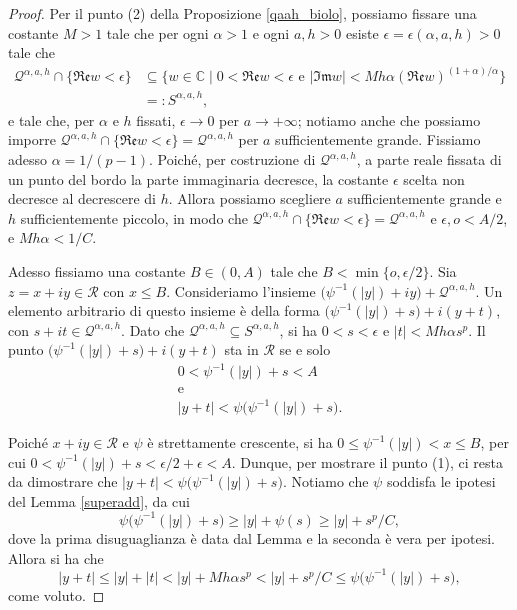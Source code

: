 \begin{proof}
    Per il punto (2) della Proposizione \ref{qaah_biolo}, possiamo fissare una costante $M>1$ tale che per ogni $\alpha>1$ e ogni $a,h>0$ esiste $\epsilon=\epsilon(\alpha,a,h)>0$ tale che
    \begin{align*}
        \mathcal{Q}^{\alpha,a,h}\cap\{\mathfrak{Re}w<\epsilon\}&\subseteq \{w\in\mathbb{C}\mid 0<\mathfrak{Re}w<\epsilon\text{ e }|\mathfrak{Im}w|<Mh\alpha(\mathfrak{Re}w)^{(1+\alpha)/\alpha}\}\\
        &=:S^{\alpha,a,h},
    \end{align*}
    e tale che, per $\alpha$ e $h$ fissati, $\epsilon\longrightarrow0$ per $a\longrightarrow+\infty$; notiamo anche che possiamo imporre $\mathcal{Q}^{\alpha,a,h}\cap\{\mathfrak{Re}w<\epsilon\}=\mathcal{Q}^{\alpha,a,h}$ per $a$ sufficientemente grande. Fissiamo adesso $\alpha=1/(p-1)$. Poiché, per costruzione di $\mathcal{Q}^{\alpha,a,h}$, a parte reale fissata di un punto del bordo la parte immaginaria decresce, la costante $\epsilon$ scelta non decresce al decrescere di $h$. Allora possiamo scegliere $a$ sufficientemente grande e $h$ sufficientemente piccolo, in modo che $\mathcal{Q}^{\alpha,a,h}\cap\{\mathfrak{Re}w<\epsilon\}=\mathcal{Q}^{\alpha,a,h}$ e $\epsilon,o<A/2$, e $Mh\alpha<1/C$.
    
    Adesso fissiamo una costante $B\in(0,A)$ tale che $B<\min\{o,\epsilon/2\}$. Sia $z=x+iy\in\mathcal{R}$ con $x\le B$. Consideriamo l'insieme $\bigl(\psi^{-1}(|y|)+iy\bigr)+\mathcal{Q}^{\alpha,a,h}$. Un elemento arbitrario di questo insieme è della forma $\bigl(\psi^{-1}(|y|)+s\bigr)+i(y+t)$, con $s+it\in\mathcal{Q}^{\alpha,a,h}$. Dato che $\mathcal{Q}^{\alpha,a,h}\subseteq S^{\alpha,a,h}$, si ha $0<s<\epsilon$ e $|t|<Mh\alpha s^p$. Il punto $\bigl(\psi^{-1}(|y|)+s\bigr)+i(y+t)$ sta in $\mathcal{R}$ se e solo \begin{gather*}
        0<\psi^{-1}(|y|)+s<A\\
        \text{e}\\
        |y+t|<\psi\big(\psi^{-1}(|y|)+s\big).
    \end{gather*}

    Poiché $x+iy\in\mathcal{R}$ e $\psi$ è strettamente crescente, si ha $0 \le \psi^{-1}(|y|)<x\le B$, per cui $0<\psi^{-1}(|y|)+s<\epsilon/2+\epsilon<A$. Dunque, per mostrare il punto (1), ci resta da dimostrare che $|y+t|<\psi\big(\psi^{-1}(|y|)+s\big)$. Notiamo che $\psi$ soddisfa le ipotesi del Lemma \ref{superadd}, da cui
    $$\psi\big(\psi^{-1}(|y|)+s\big)\ge |y|+\psi(s)\ge |y|+s^p/C,$$
    dove la prima disuguaglianza è data dal Lemma e la seconda è vera per ipotesi. Allora si ha che
    $$|y+t| \le |y|+|t|<|y|+Mh\alpha s^p<|y|+s^p/C \le \psi\big(\psi^{-1}(|y|)+s\big),$$
    come voluto.


\end{proof}

